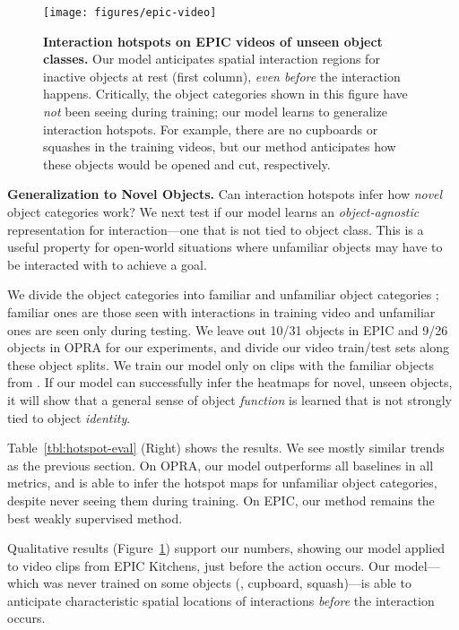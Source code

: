 \documentclass[10pt,twocolumn,letterpaper]{article}
\newcommand{\reffig}[1]{Figure~\ref{#1}}
\newcommand{\reftbl}[1]{Table~\ref{#1}}
\begin{document}
\begin{figure}
\centering
\texttt{[image: figures/epic-video]}
\vspace*{-0.25in}
\caption{\textbf{Interaction hotspots on EPIC videos of unseen object classes.} Our model anticipates spatial interaction regions for inactive objects at rest (first column), \emph{even before} the interaction happens. Critically, the object categories shown in this figure have \emph{not} been seeing during training; our model learns to generalize interaction hotspots.  For example, there are no cupboards or squashes in the training videos, but our method anticipates how these objects would be opened and cut, respectively. } \label{fig:epic-video}
\end{figure}

\vspace{0.05in}
\noindent\textbf{Generalization to Novel Objects.} Can interaction hotspots infer how \emph{novel} object categories work?  We next test if our model learns an \emph{object-agnostic} representation for interaction---one that is not tied to object class. This is a useful property for open-world situations where unfamiliar objects may have to be interacted with to achieve a goal. 

We divide the object categories  into familiar and unfamiliar object categories ; familiar ones are those seen with interactions in training video and unfamiliar ones are seen only during testing. We leave out 10/31 objects in EPIC and 9/26 objects in OPRA for our experiments, and divide our video train/test sets along these object splits.  We train our model only on clips with the familiar objects from . If our model can successfully infer the heatmaps for novel, unseen objects, it will show that a general sense of object \emph{function} is learned that is not strongly tied to object \emph{identity}. 

\reftbl{tbl:hotspot-eval} (Right) shows the results. We see mostly similar trends as the previous section.  On OPRA, our model outperforms all baselines in all metrics, and is able to infer the hotspot maps for unfamiliar object categories, despite never seeing them during training. 
On EPIC, our method remains the best weakly supervised method.


Qualitative results (\reffig{fig:epic-video}) support our numbers, showing our model applied to video clips from EPIC Kitchens, just before the action occurs. Our model---which was never trained on some objects (\eg, cupboard, squash)---is able to anticipate characteristic spatial locations of interactions \emph{before} the interaction occurs. 
\end{document}
